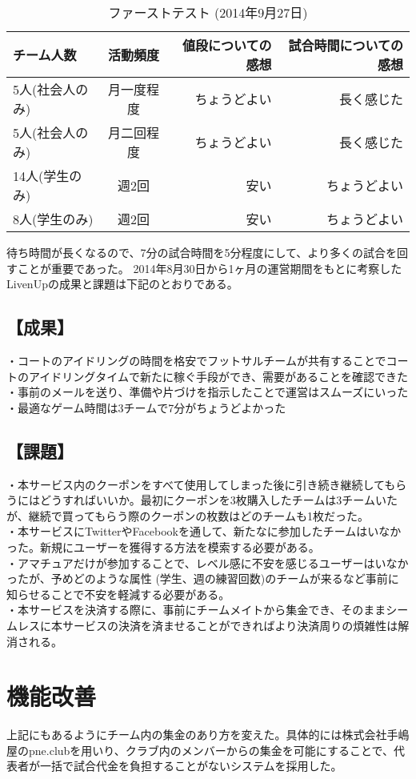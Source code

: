 \begin{table}[htb]
	\begin{center}
		\caption{ファーストテスト (2014年9月27日)}
		\begin{tabular}{|l|c|r||r|} \hline
			チーム人数 & 活動頻度 & 値段についての感想 & 試合時間についての感想 \\ \hline \hline
			5人(社会人のみ) & 月一度程度 & ちょうどよい & 長く感じた \\
			5人(社会人のみ) & 月二回程度 & ちょうどよい & 長く感じた \\
			14人(学生のみ) & 週2回 & 安い & ちょうどよい \\
			8人(学生のみ) & 週2回 & 安い & ちょうどよい \\ \hline
		\end{tabular}
		\label{tab:price}
	\end{center}
\end{table}

待ち時間が長くなるので、7分の試合時間を5分程度にして、より多くの試合を回すことが重要であった。
2014年8月30日から1ヶ月の運営期間をもとに考察したLivenUpの成果と課題は下記のとおりである。

\subsection{【成果】}
・コートのアイドリングの時間を格安でフットサルチームが共有することでコートのアイドリングタイムで新たに稼ぐ手段ができ、需要があることを確認できた
\\
・事前のメールを送り、準備や片づけを指示したことで運営はスムーズにいった
\\
・最適なゲーム時間は3チームで7分がちょうどよかった
\subsection{【課題】}
・本サービス内のクーポンをすべて使用してしまった後に引き続き継続してもらうにはどうすればいいか。最初にクーポンを3枚購入したチームは3チームいたが、継続で買ってもらう際のクーポンの枚数はどのチームも1枚だった。
\\・本サービスにTwitterやFacebookを通して、新たなに参加したチームはいなかった。新規にユーザーを獲得する方法を模索する必要がある。
\\・アマチュアだけが参加することで、レベル感に不安を感じるユーザーはいなかったが、予めどのような属性 (学生、週の練習回数)のチームが来るなど事前に知らせることで不安を軽減する必要がある。
\\・本サービスを決済する際に、事前にチームメイトから集金でき、そのままシームレスに本サービスの決済を済ませることができればより決済周りの煩雑性は解消される。





\section{機能改善}
上記にもあるようにチーム内の集金のあり方を変えた。具体的には株式会社手嶋屋のpne.clubを用いり、クラブ内のメンバーからの集金を可能にすることで、代表者が一括で試合代金を負担することがないシステムを採用した。

